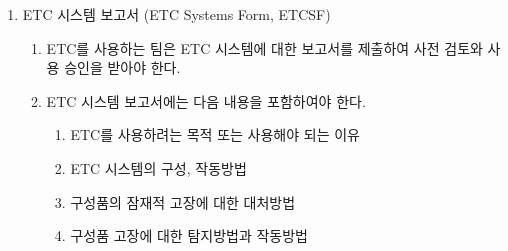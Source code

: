 \documentclass[final,a4paper,10pt]{report}
\begin{document}
\begin{enumerate}
\begin{enumerate}
      \item\label{rule:formula-technical.electronic-throttle-control.commercial-systems.approval-document} 승인을 받으려면 다음 내용을 포함하는 문서를 제출하여야 한다.
        \begin{enumerate}
          \item\label{rule:formula-technical.electronic-throttle-control.commercial-systems.approval-document.target-system} 팀이 사용 승인을 받고자 하는 ETC 시스템
          \item\label{rule:formula-technical.electronic-throttle-control.commercial-systems.approval-document.deviations} 상용 시스템이 준수하지 못하는 ETC 규정
          \item\label{rule:formula-technical.electronic-throttle-control.commercial-systems.approval-document.justification} 사용하고자 하는 상용 시스템의 허용을 결정하기 위해 규정 미준수 부분에 대한 충분한 기술적 세부 정보
        \end{enumerate}
    \end{enumerate}

  \item\label{rule:formula-technical.electronic-throttle-control.etcsf} ETC 시스템 보고서 (ETC Systems Form, ETCSF) \label{item:ETC 시스템 보고서}
    \begin{enumerate}
      \item\label{rule:formula-technical.electronic-throttle-control.etcsf.mandatory-before-approval} ETC를 사용하는 팀은 ETC 시스템에 대한 보고서를 제출하여 사전 검토와 사용 승인을 받아야 한다.

      \item\label{rule:formula-technical.electronic-throttle-control.etcsf.report-contents} ETC 시스템 보고서에는 다음 내용을 포함{\color{blue}하여야} 한다.
        \begin{enumerate}
          \item\label{rule:formula-technical.electronic-throttle-control.etcsf.report-contents.purpose-of-use} ETC를 사용하려는 목적 또는 사용해야 되는 이유
          \item\label{rule:formula-technical.electronic-throttle-control.etcsf.report-contents.configuration-and-operation} ETC 시스템의 구성, 작동방법
          \item\label{rule:formula-technical.electronic-throttle-control.etcsf.report-contents.component-failure-response} 구성품의 잠재적 고장에 대한 대처방법
          \item\label{rule:formula-technical.electronic-throttle-control.etcsf.report-contents.failure-detection-and-behavior} 구성품 고장에 대한 탐지방법과 작동방법
        \end{enumerate}


\end{enumerate}
\end{enumerate}
\end{document}
